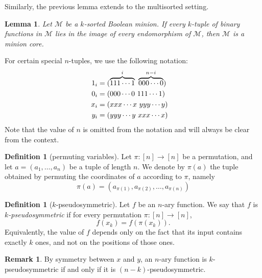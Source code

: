 \documentclass{amsart}
\numberwithin{equation}{section}
\theoremstyle{plain}
\newtheorem{lemma}[theorem]{Lemma}
\theoremstyle{definition}
\newtheorem{definition}[theorem]{Definition}
\newtheorem{remark}[theorem]{Remark}
\def\minion#1{\mathcal{#1}}
\begin{document}
Similarly, the previous lemma extends to the multisorted setting.

\begin{lemma}
  \label{proof-minion}
  Let $\minion{M}$ be a $k$-sorted Boolean minion. If every $k$-tuple of binary functions in $\minion{M}$ lies in the image of every endomorphism of $\minion{M}$, then $\minion{M}$ is a minion core.
\end{lemma}

For certain special $n$-tuples, we use the following notation:
\begin{align*}
  1_i &= (\overbrace{111\cdots 1}^i\ \overbrace{000\cdots 0}^{n-i}) \cr
  0_i &= (000\cdots 0\ 111\cdots 1) \cr
  x_i &= (xxx\cdots x\ yyy\cdots y) \cr
  y_i &= (yyy\cdots y\ xxx\cdots x) 
\end{align*}
Note that the value of $n$ is omitted from the notation and will always be clear from the context.

\begin{definition}[permuting variables] Let $\pi\colon [n]\to [n]$ be a permutation, and let $a=(a_1,\dots,a_n)$ be a tuple of length $n$. We denote by $\pi(a)$
the tuple obtained by permuting the coordinates of $a$ according to $\pi$, namely
$$\pi(a) = (a_{\pi(1)},a_{\pi(2)},\dots,a_{\pi(n)})$$
\end{definition}

\begin{definition}[$k$-pseudosymmetric] 
Let $f$ be an $n$-ary function. We say that $f$ is {\em $k$-pseudosymmetric} if for every permutation $\pi:[n]\to[n]$,
$$f(x_k)=f(\pi(x_k)).$$
Equivalently, the value of $f$ depends only on the fact that its input contains exactly $k$ ones, and not on the positions of those ones.
\end{definition}

\begin{remark}
By symmetry between $x$ and $y$, an $n$-ary function is $k$-pseudosymmetric if and only if it is $(n-k)$-pseudosymmetric.
\end{remark}
\end{document}
